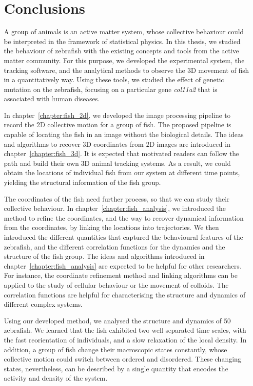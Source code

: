 \documentclass[11pt,twoside]{report}
\begin{document}
\chapter{Conclusions}
\label{chapter:conclusion}

A group of animals is an active matter system, whose collective behaviour could be interpreted in the framework of statistical physics. In this thesis, we studied the behaviour of zebrafish with the existing concepts and tools from the active matter community.
For this purpose, we developed the experimental system, the tracking software, and the analytical methods to observe the 3D movement of fish in a quantitatively way.
Using these tools, we studied the effect of genetic mutation on the zebrafish, focusing on a particular gene \emph{col11a2} that is associated with human diseases.

In chapter~\ref{chapter:fish_2d}, we developed the image processing pipeline to record the 2D collective motion for a group of fish. The proposed pipeline is capable of locating the fish in an image without the biological details.
The ideas and algorithms to recover 3D coordinates from 2D images are introduced in chapter~\ref{chapter:fish_3d}. It is expected that motivated readers can follow the path and build their own 3D animal tracking systems. As a result, we could obtain the locations of individual fish from our system at different time points, yielding the structural information of the fish group.

The coordinates of the fish need further process, so that we can study their collective behaviour. In chapter~\ref{chapter:fish_analysis}, we introduced the method to refine the coordinates, and the way to recover dynamical information from the coordinates, by linking the locations into trajectories.
We then introduced the different quantities that captured the behavioural features of the zebrafish, and the different correlation functions for the dynamics and the structure of the fish group.
The ideas and algorithms introduced in chapter~\ref{chapter:fish_analysis} are expected to be helpful for other researchers. For instance, the coordinate refinement method and linking algorithms can be applied to the study of cellular behaviour or the movement of colloids. The correlation functions are helpful for characterising the structure and dynamics of different complex systems.

Using our developed method, we analysed the structure and dynamics of 50 zebrafish. We learned that the fish exhibited two well separated time scales, with the fast reorientation of individuals, and a slow relaxation of the local density. In addition, a group of fish change their macroscopic states constantly, whose collective motion could switch between ordered and disordered. These changing states, nevertheless, can be described by a single quantity that encodes the activity and density of the system.
\end{document}
